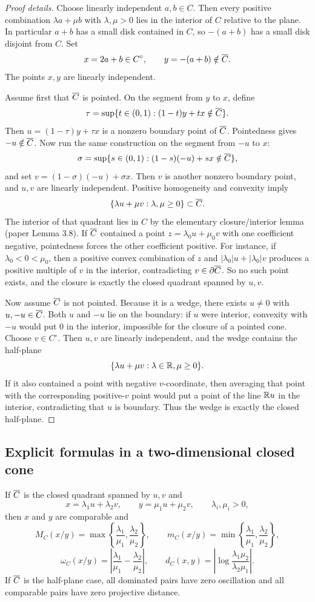 \begin{proof}[Proof details]
Choose linearly independent $a,b\in C$.
Then every positive combination $\lambda a+\mu b$ with $\lambda,\mu>0$ lies in the interior of $C$ relative to the plane.
In particular $a+b$ has a small disk contained in $C$, so $-(a+b)$ has a small disk disjoint from $C$.
Set
\[
  x=2a+b\in C^\circ,
  \qquad
  y=-(a+b)\notin \overline{C}.
\]
The points $x,y$ are linearly independent.

Assume first that $\overline{C}$ is pointed.
On the segment from $y$ to $x$, define
\[
  \tau=\sup\{t\in(0,1):(1-t)y+tx\notin \overline{C}\}.
\]
Then $u=(1-\tau)y+\tau x$ is a nonzero boundary point of $\overline{C}$.
Pointedness gives $-u\notin\overline{C}$.
Now run the same construction on the segment from $-u$ to $x$:
\[
  \sigma=\sup\{s\in(0,1):(1-s)(-u)+sx\notin\overline{C}\},
\]
and set $v=(1-\sigma)(-u)+\sigma x$.
Then $v$ is another nonzero boundary point, and $u,v$ are linearly independent.
Positive homogeneity and convexity imply
\[
  \{\lambda u+\mu v:\lambda,\mu\ge0\}\subset\overline{C}.
\]
The interior of that quadrant lies in $C$ by the elementary closure/interior lemma (paper Lemma 3.8).
If $\overline{C}$ contained a point $z=\lambda_0u+\mu_0v$ with one coefficient negative, pointedness forces the other coefficient positive.
For instance, if $\lambda_0<0<\mu_0$, then a positive convex combination of $z$ and $|\lambda_0|u+|\lambda_0|v$ produces a positive multiple of $v$ in the interior, contradicting $v\in\partial\overline{C}$.
So no such point exists, and the closure is exactly the closed quadrant spanned by $u,v$.

Now assume $\overline{C}$ is not pointed.
Because it is a wedge, there exists $u\ne0$ with $u,-u\in\overline{C}$.
Both $u$ and $-u$ lie on the boundary: if $u$ were interior, convexity with $-u$ would put $0$ in the interior, impossible for the closure of a pointed cone.
Choose $v\in C^\circ$.
Then $u,v$ are linearly independent, and the wedge contains the half-plane
\[
  \{\lambda u+\mu v:\lambda\in\mathbb{R},
\mu\ge0\}.
\]
If it also contained a point with negative $v$-coordinate, then averaging that point with the corresponding positive-$v$ point would put a point of the line $\mathbb{R} u$ in the interior, contradicting that $u$ is boundary.
Thus the wedge is exactly the closed half-plane.
\end{proof}

\subsection{Explicit formulas in a two-dimensional closed cone}
If $\overline{C}$ is the closed quadrant spanned by $u,v$ and
\[
  x=\lambda_1u+\lambda_2v,
  \qquad
  y=\mu_1u+\mu_2v,
  \qquad
  \lambda_i,
  \mu_i>0,
\]
then $x$ and $y$ are comparable and
\[
  M_C(x/y)=\max\left\{\frac{\lambda_1}{\mu_1},\frac{\lambda_2}{\mu_2}\right\},
  \qquad
  m_C(x/y)=\min\left\{\frac{\lambda_1}{\mu_1},\frac{\lambda_2}{\mu_2}\right\},
\]
\[
  \omega_C(x/y)=\left|\frac{\lambda_1}{\mu_1}-\frac{\lambda_2}{\mu_2}\right|,
  \qquad
  d_C(x,y)=\left|\log\frac{\lambda_1\mu_2}{\lambda_2\mu_1}\right|.
\]
If $\overline{C}$ is the half-plane case, all dominated pairs have zero oscillation and all comparable pairs have zero projective distance.

